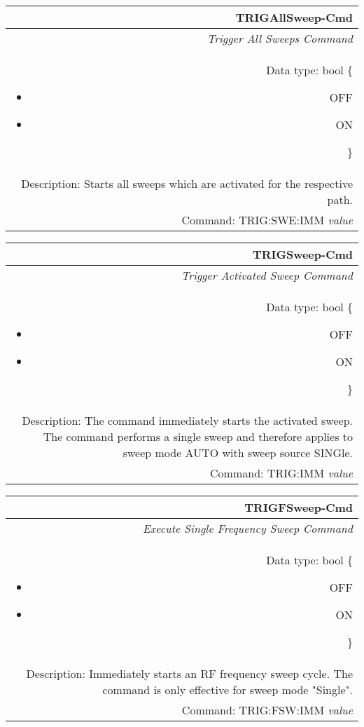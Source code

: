 \documentclass[openany]{article}
\begin{document}
%
		\begin{tabular}{N}
			\hline
			\bfseries TRIGAllSweep-Cmd \\ \hline
			\emph{Trigger All Sweeps Command} \\
			Data type: bool \{\begin{itemize}[noitemsep]
				\small
				\item[] OFF
				\item[] ON
			\end{itemize}\} \\
			Description: Starts all sweeps which are activated for the respective path. \\
			Command: TRIG:SWE:IMM \emph{value} \\

		\end{tabular}
%
		\begin{tabular}{N}
			\hline
			\bfseries TRIGSweep-Cmd \\ \hline
			\emph{Trigger Activated Sweep Command} \\
			Data type: bool \{\begin{itemize}[noitemsep]
				\small
				\item[] OFF
				\item[] ON
			\end{itemize}\} \\
			Description: The command immediately starts the activated sweep. The command performs a single sweep and therefore applies to sweep mode AUTO with sweep source SINGle.  \\
			Command: TRIG:IMM \emph{value} \\

		\end{tabular}
%
		\begin{tabular}{N}
			\hline
			\bfseries TRIGFSweep-Cmd \\ \hline
			\emph{Execute Single Frequency Sweep Command} \\
			Data type: bool \{\begin{itemize}[noitemsep]
				\small
				\item[] OFF
				\item[] ON
			\end{itemize}\} \\
			Description: Immediately starts an RF frequency sweep cycle. The command is only effective for sweep mode "Single". \\
			Command: TRIG:FSW:IMM \emph{value} \\

		\end{tabular}
\end{document}
